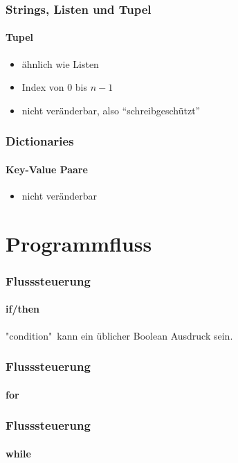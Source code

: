 \documentclass[12pt,ngerman]{beamer}
\begin{document}
\begin{frame}[fragile]
\frametitle{Strings, Listen und Tupel}
\framesubtitle{Tupel}

\begin{itemize}
	\item ähnlich wie Listen
	\item Index von $0$ bis $n-1$
	\item nicht veränderbar, also \enquote{schreibgeschützt}
\end{itemize}



\end{frame}


\begin{frame}[fragile]
\frametitle{Dictionaries}
\framesubtitle{Key-Value Paare}

\begin{itemize}
	\item nicht veränderbar
\end{itemize}



\end{frame}

\section{Programmfluss}

\begin{frame}[fragile]
\frametitle{Flusssteuerung}
\framesubtitle{if/then}



"condition"\ kann ein üblicher Boolean Ausdruck sein.

\end{frame}

\begin{frame}[fragile]
\frametitle{Flusssteuerung}
\framesubtitle{for}



\end{frame}

\begin{frame}[fragile]
\frametitle{Flusssteuerung}
\framesubtitle{while}



\end{frame}
\end{document}
